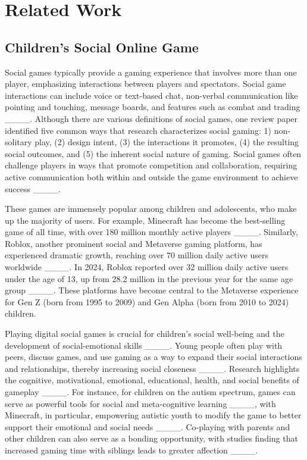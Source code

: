 \section{Related Work}
\subsection{Children's Social Online Game}
Social games typically provide a gaming experience that involves more than one player, emphasizing interactions between players and spectators. Social game interactions can include voice or text-based chat, non-verbal communication like pointing and touching, message boards, and features such as combat and trading ____. Although there are various definitions of social games, one review paper identified five common ways that research characterizes social gaming: 1) non-solitary play, (2) design intent, (3) the interactions it promotes, (4) the resulting social outcomes, and (5) the inherent social nature of gaming. Social games often challenge players in ways that promote competition and collaboration, requiring active communication both within and outside the game environment to achieve success ____.

 These games are immensely popular among children and adolescents, who make up the majority of users. For example, Minecraft has become the best-selling game of all time, with over 180 million monthly active players ____. Similarly, Roblox, another prominent social and Metaverse gaming platform, has experienced dramatic growth, reaching over 70 million daily active users worldwide ____. In 2024, Roblox reported over 32 million daily active users under the age of 13, up from 28.2 million in the previous year for the same age group ____. These platforms have become central to the Metaverse experience for Gen Z (born from 1995 to 2009) and Gen Alpha (born from 2010 to 2024) children.

Playing digital social games is crucial for children's social well-being and the development of social-emotional skills ____. Young people often play with peers, discuss games, and use gaming as a way to expand their social interactions and relationships, thereby increasing social closeness ____. Research highlights the cognitive, motivational, emotional, educational, health, and social benefits of gameplay ____. For instance, for children on the autism spectrum, games can serve as powerful tools for social and meta-cognitive learning ____, with Minecraft, in particular, empowering autistic youth to modify the game to better support their emotional and social needs ____. Co-playing with parents and other children can also serve as a bonding opportunity, with studies finding that increased gaming time with siblings leads to greater affection ____.

